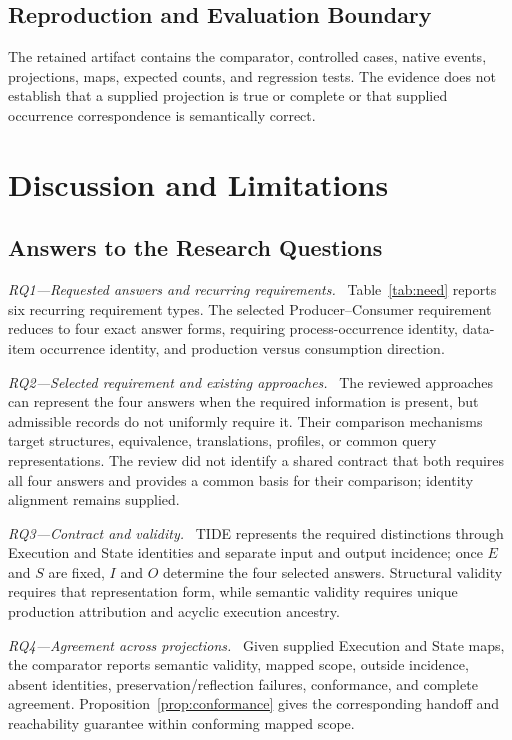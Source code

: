 \documentclass[conference]{IEEEtran}
\theoremstyle{tideproposition}
\newcommand{\reviewitem}[1]{\par\addvspace{0.22\baselineskip}\noindent\emph{#1.}\ }
\begin{document}
\subsection{Reproduction and Evaluation Boundary}
The retained artifact contains the comparator, controlled cases, native
events, projections, maps, expected counts, and regression tests. The evidence
does not establish that a supplied projection is true or complete or that
supplied occurrence correspondence is semantically correct.

\FloatBarrier
\section{Discussion and Limitations}
\subsection{Answers to the Research Questions}

\reviewitem{RQ1---Requested answers and recurring requirements}
Table~\ref{tab:need} reports six recurring requirement types. The selected
Producer--Consumer requirement reduces to four exact answer forms, requiring
process-occurrence identity, data-item occurrence identity, and production
versus consumption direction.

\reviewitem{RQ2---Selected requirement and existing approaches}
The reviewed approaches can represent the four answers when the required information is present, but admissible records do not uniformly require it. Their comparison mechanisms target structures, equivalence, translations, profiles, or common query representations. The review did not identify a shared contract that both requires all four answers and provides a common basis for their comparison; identity alignment remains supplied.

\reviewitem{RQ3---Contract and validity}
TIDE represents the required distinctions through Execution and State identities
and separate input and output incidence; once $E$ and $S$ are fixed, $I$ and $O$ determine the four
selected answers. Structural validity requires that representation form, while
semantic validity requires unique production attribution and acyclic execution ancestry.

\reviewitem{RQ4---Agreement across projections}
Given supplied Execution and State maps, the comparator reports semantic validity, mapped scope, outside incidence, absent identities, preservation/reflection failures, conformance, and complete agreement. Proposition~\ref{prop:conformance} gives the corresponding handoff and reachability guarantee within conforming mapped scope.
\end{document}
